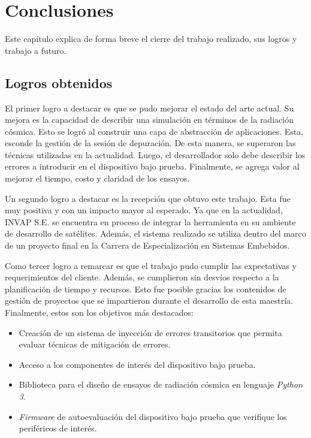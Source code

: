 \chapter{Conclusiones}
\label{Chapter5}

Este capítulo explica de forma breve el cierre del trabajo realizado, sus logros y trabajo a futuro.

\section{Logros obtenidos}
\label{sec:logros}

El primer logro a destacar es que se pudo mejorar el estado del arte actual.
Su mejora es la capacidad de describir una simulación en términos de la radiación cósmica.
Esto se logró al construir una capa de abstracción de aplicaciones.
Esta, esconde la gestión de la sesión de depuración.
De esta manera, se superaron las técnicas utilizadas en la actualidad.
Luego, el desarrollador solo debe describir los errores a introducir en el dispositivo bajo prueba.
Finalmente, se agrega valor al mejorar el tiempo, costo y claridad de los ensayos.

Un segundo logro a destacar es la recepción que obtuvo este trabajo.
Esta fue muy positiva y con un impacto mayor al esperado.
Ya que en la actualidad, INVAP S.E. se encuentra en proceso de integrar la herramienta en su ambiente de desarrollo de satélites.
Además, el sistema realizado se utiliza dentro del marco de un proyecto final en la Carrera de Especialización en Sistemas Embebidos.

Como tercer logro a remarcar es que el trabajo pudo cumplir las expectativas y requerimientos del cliente.
Además, se cumplieron sin desvíos respecto a la planificación de tiempo y recursos.
Esto fue posible gracias los contenidos de gestión de proyectos que se impartieron durante el desarrollo de esta maestría.
Finalmente, estos son los objetivos más destacados:

\begin{itemize}
    \item Creación de un sistema de inyección de errores transitorios que permita evaluar técnicas de mitigación de errores.
    \item Acceso a los componentes de interés del dispositivo bajo prueba.
    \item Biblioteca para el diseño de ensayos de radiación cósmica en lenguaje \emph{Python 3}.
    \item \emph{Firmware} de autoevaluación del dispositivo bajo prueba que verifique los periféricos de interés.
\end{itemize}

